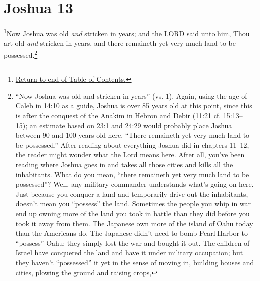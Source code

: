 \chapter{Joshua 13}
\footnote{\textcolor[rgb]{0.00,0.25,0.00}{\hyperlink{TOC}{Return to end of Table of Contents.}}}\textcolor[rgb]{0.00,0.00,1.00}{Now Joshua was old \emph{and} stricken in years; and the LORD said unto him, Thou art old \emph{and} stricken in years, and there remaineth yet very much land to be possessed.}\footnote{“Now Joshua was old and stricken in
years” (vs. 1). Again, using the age of Caleb in
14:10 as a guide, Joshua is over 85 years old at
this point, since this is after the conquest of the
Anakim in Hebron and Debir (11:21 cf. 15:13–
15); an estimate based on 23:1 and 24:29 would
probably place Joshua between 90 and 100
years old here.
“There remaineth yet very much land to
be possessed.” After reading about everything
Joshua did in chapters 11–12, the reader might
wonder what the Lord means here. After all,
you’ve been reading where Joshua goes in and
takes all those cities and kills all the inhabitants.
What do you mean, “there remaineth yet very
much land to be possessed”?
Well, any military commander understands what’s going on here. Just because you conquer a land and temporarily drive out the inhabitants, doesn’t mean you “possess” the land. Sometimes the people you whip in war end up owning more of the land you took in battle than they did before you took it away from them. The Japanese own more of the island of Oahu today than the Americans do. The Japanese didn’t need to bomb Pearl Harbor to “possess” Oahu; they simply lost the war and bought it out. The children of Israel have conquered the land and have it under military occupation; but they haven’t “possessed” it yet in the sense of moving in, building houses and cities, plowing the ground and raising crops,
}
